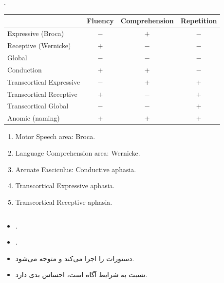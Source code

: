 \documentclass[a4paper,12pt]{extbook}
\begin{document}
\subsection*{}
.
\begin{latin}
\begin{center}
\begin{tabular}{lccc}
 & Fluency & Comprehension & Repetition\\\hline
Expressive (Broca) & $-$ & $+$ & $-$\\
Receptive (Wernicke) & $+$ & $-$ & $-$\\
Global & $-$ & $-$ & $-$\\
Conduction & $+$ & $+$ & $-$\\
Transcortical Expressive & $-$ & $+$ & $+$\\
Transcortical Receptive & $+$ & $-$ & $+$\\
Transcortical Global & $-$ & $-$ & $+$\\
Anomic (naming) & $+$ & $+$ & $+$\\
\end{tabular}
\end{center}
\end{latin}
\begin{center}
\end{center}
\begin{latin}
\begin{enumerate}
\item Motor Speech area: Broca.
\item Language Comprehension area: Wernicke.
\item Arcuate Fasciculus: Conductive aphasia.
\item Transcortical Expressive aphasia.
\item Transcortical Receptive aphasia.
\end{enumerate}
\end{latin}

\subsection*{}
\begin{itemize}
\item {}.
\item {}.
\item دستورات را اجرا می‌کند و متوجه می‌شود.
\item نسبت به شرایط آگاه است، احساس بدی دارد.
\end{itemize}
\end{document}
